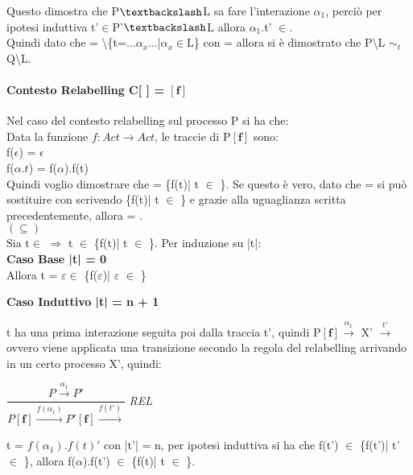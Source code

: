 Questo dimostra che P$\textbackslash$L sa fare l'interazione $\alpha_{1}$, perciò per ipotesi induttiva t'$\in$P'$\textbackslash$L allora $\alpha_{1}$.t' $\in$.
\\

Quindi dato che  = \textbackslash \{t=...$\alpha_{x}$...|$\alpha_{x}\in$L\} con  =   allora si è dimostrato che  P\textbackslash L $\sim_{t}$ Q\textbackslash L.

\paragraph{Contesto Relabelling  C[ ] = $\mathbf{[f]}$ } \mbox{}

Nel caso del contesto relabelling sul processo P si ha che:	\\	
Data la funzione $f: Act \rightarrow Act$, le traccie di P$\mathbf{[f]}$ sono:\\
f($\epsilon$) = $\epsilon$\\
f($\alpha.t$) =  f($\alpha$).f(t)\\
Quindi voglio dimostrare che  = \{f(t)| t $\in$ \}. Se questo è vero, dato che  =   si può sostituire  con  scrivendo \{f(t)| t $\in$ \} e grazie alla uguaglianza scritta precedentemente, allora  = . \\

$(\subseteq)$ \\

Sia t$\in$  $\Rightarrow$ t $\in$ \{f(t)| t $\in$ \}. Per induzione su |t|:
\\

\textbf{Caso Base |t| = 0}
\\
Allora t = $\varepsilon \in$ \{f($\varepsilon$)| $\varepsilon$ $\in$ \}

\pagebreak
\textbf{Caso Induttivo |t| = n + 1}

t ha una prima interazione seguita poi dalla traccia t', quindi P$\mathbf{[f]}  \overset{\alpha_{1}}\rightarrow $ X' $\overset{t'}\rightarrow$ ovvero viene applicata una transizione secondo la regola del relabelling arrivando in un certo processo X', quindi:

$\dfrac{P \overset{\alpha_{1}}\rightarrow P'}{P \mathbf{[f]} \overset{f(\alpha_{1})}\rightarrow P'\mathbf{[f]}\overset{f(t')}\rightarrow}$ \textit{REL} 

t = $f(\alpha_{1}).f(t)'$ con |t'| = n, per ipotesi induttiva si ha che f(t') $\in$ \{f(t')| t' $\in$ \}, allora f($\alpha$).f(t') $\in$ \{f(t)| t $\in$ \}.\\


